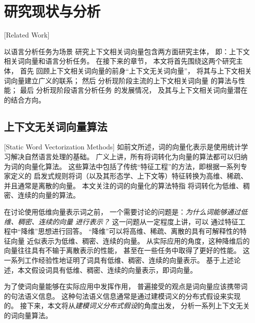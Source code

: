 \section{研究现状与分析}[Related Work]

以语言分析任务为场景
研究上下文相关词向量包含两方面研究主体，
即：上下文相关词向量和语言分析任务。
在接下来的章节，
本文将首先围绕这两个研究主体，
首先
回顾上下文相关词向量的前身``上下文无关词向量''，
将其与上下文相关词向量建立广义的联系；
然后
分析现阶段主流的上下文相关词向量
的算法与性能；
最后
分析现阶段语言分析任务
的发展情况，
及其与上下文相关词向量潜在的结合方向。

\subsection{上下文无关词向量算法}[Static Word Vectorization Methods]
如前文所述，词的向量化表示是使用统计学习解决自然语言处理的基础。
广义上讲，所有将词转化为向量的算法都可以归纳为词的向量化算法。
这些算法中包括了传统``特征工程''的方法，即根据一系列专家定义的
启发式规则将词（以及其形态学、上下文等）特征转换为高维、稀疏、
并且通常是离散的向量。
本文关注的词的向量化的算法特指
将词转化为低维、稠密、连续的向量的算法。

在讨论使用低维向量表示词之前，
一个需要讨论的问题是：\textit{为什么词能够通过低维、稠密、连续的向量
进行表示？}
这一问题从一定程度上讲，可以
通过特征工程中``降维''思想进行回答。
``降维''可以将高维、稀疏、离散的具有可解释性的特征向量
近似表示为低维、稠密、连续的向量。
从实际应用的角度，这种降维后的向量往往具有不输于离散表示的性能，
甚至在一些任务中取得了更好的性能。\cite{lei-EtAl:2014:P14-1,lei-EtAl:2015:NAACL-HLT}
这一系列工作经验性地证明了词具有低维、稠密、连续的向量表示。
基于上述论述，本文假设词具有低维、稠密、连续的向量表示，即词向量。

为了使词向量能够在实际应用中发挥作用，
普遍接受的观点是词向量应该携带词的句法语义信息。\cite{DBLP:journals/corr/MikolovSCCD13,faruqui-EtAl:2016:RepEval,7478417}
这种句法语义信息通常是通过建模词义的分布式假设来实现的。
接下来，本文将从\textit{建模词义分布式假设}的角度出发，
分析一系列上下文无关的词向量算法。

